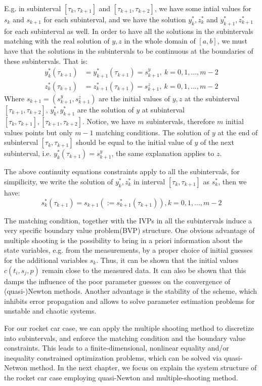 E.g. in subinterval $ [\tau_k, \tau_{k+1}]$ and $ [\tau_{k+1}, \tau_{k+2}]$, we have some intial values for $s_k$ and $s_{k+1}$ for each subinterval, and we have the solution  $y_k^*, z_k^*$ and $y_{k+1}^*, z_{k+1}^*$ for each subinterval as well. In order to have all the solutions in the subintervals matching with the real solution of $y, z$ in the whole domain of $[a, b]$, we must have that the solutions in the subintervals to be continuous at the boundaries of these subintervals. That is: 
\begin{align*} 
	y_k^*(\tau_{k+1}) &=  y_{k+1}^*(\tau_{k+1}) = s_{k+1}^y, \  k = 0, 1, ..., m-2  \\
	z_k^*(\tau_{k+1}) &=  z_{k+1}^*(\tau_{k+1}) = s_{k+1}^z,\  k = 0, 1, ..., m-2  
\end{align*}
Where $s_{k+1} = (s_{k+1}^y,  s_{k+1}^z) $ are the initial values of $y, z$ at the subinterval $ [\tau_{k+1}, \tau_{k+2}]$, $y_k^*, y_{k+1}^*$ are the solution of $y$ at subinterval  $ [\tau_{k}, \tau_{k+1}], [\tau_{k+1}, \tau_{k+2}]$. Notice, we have $m$ subintervals, therefore $m$ initial values points but only $m-1$ matching conditions. The solution of $y$ at the end of subinterval $ [\tau_{k}, \tau_{k+1}]$ should be equal to the initial value of $y$ of the next subinterval, i.e. $y_k^*(\tau_{k+1}) =  s_{k+1}^y$, the same explanation applies to $z$.  

The above continuity equations constraints apply to all the subintervals, for simpilicity, we write the solution of $y_k^*, z_k^*$ in interval $ [\tau_{k}, \tau_{k+1}]$ as $s_k^*$, then we have: 
$$s_k^*(\tau_{k+1}) = s_{k+1} (:= s_{k+1}^*(\tau_{k+1})), k = 0, 1, ..., m-2$$

The matching condition, together with the IVPs in all the subintervals induce a very specific boundary value problem(BVP) structure. One obvious advantage of multiple shooting is the possibility to bring in a priori information about the state variables, e.g. from the measurements, by a proper choice of initial guesses for the additional variables $s_k$. Thus, it can be shown that the initial values $c(t_i, s_j, p) $ remain close to the measured data. It can also be shown that this damps the influence of the poor parameter guesses on the convergence of (quasi-)Newton methods. Another advantage is the stability of the scheme, which inhibits error propagation and allows to solve parameter estimation problems for unstable and chaotic systems. 

For our rocket car case, we can apply the multiple shooting method to discretize into subintervals, and enforce the matching condition and the boundary value constraints. This leads to a finite-dimensional, nonlinear equality and/or inequality constrained optimization problems, which can be solved via quasi-Netwon method. In the next chapter, we focus on explain the system structure of the rocket car case employing quasi-Newton and multiple-shooting method.







